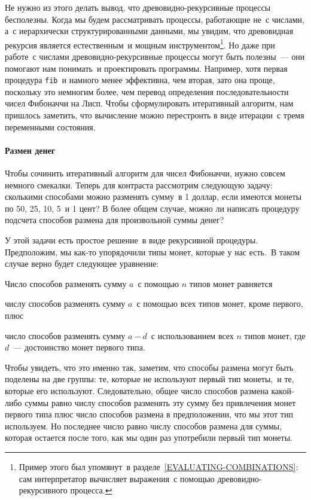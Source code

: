 Не нужно из этого делать вывод, что древовидно-рекурсивные
процессы бесполезны.  Когда мы будем рассматривать процессы,
работающие не~с числами, а~с иерархически структурированными данными,
мы увидим, что древовидная рекурсия является естественным~и мощным
инструментом\footnote{Пример этого был упомянут~в разделе~\ref{EVALUATING-COMBINATIONS}: сам интерпретатор
вычисляет выражения~с помощью дре\-во\-видно-рекурсивного процесса.
}.
Но даже при работе~с числами древовидно-рекурсивные процессы могут быть 
полезны~--- они помогают нам понимать~и проектировать программы.  Например, 
хотя первая процедура {\tt fib}~и намного менее эффективна, чем
вторая, зато она проще, поскольку это немногим более, чем перевод
определения последовательности чисел Фибоначчи на Лисп.  Чтобы
сформулировать итеративный алгоритм, нам пришлось заметить, что
вычисление можно перестроить в виде итерации~с тремя 
переменными \mbox{состояния}.

\paragraph{Размен денег}


Чтобы сочинить итеративный алгоритм для чисел Фибоначчи,
нужно совсем немного смекалки.  Теперь для контраста рассмотрим
следующую задачу: сколькими способами можно разменять сумму~в 1
доллар, если имеются монеты по 50, 25, 10, 5~и 1 цент? В более
общем случае, можно ли написать процедуру подсчета способов размена 
для произвольной суммы денег?

У этой задачи есть простое решение~в виде рекурсивной
процедуры.  Предположим, мы как-то упорядочили типы монет, которые у
нас есть.~В таком случае верно будет следующее уравнение:

Число способов разменять сумму $a$~с помощью $n$ типов монет равняется
\begin{plainlist}
\item числу способов разменять сумму
$a$~с помощью всех типов монет, кроме первого, плюс

\item число способов разменять сумму $a -
d$~с использованием всех $n$ типов монет, где
$d$~--- достоинство монет первого типа.
\end{plainlist}

Чтобы увидеть, что это именно так, заметим, что способы
размена могут быть поделены на две группы: те, которые не используют
первый тип монеты,~и те, которые его используют.  Следовательно, общее 
число способов размена какой-либо суммы равно числу способов разменять 
эту сумму без привлечения монет первого типа плюс число способов размена 
в предположении, что мы этот тип используем.  Но последнее число равно 
числу способов размена для суммы, которая остается после того, как мы
один раз употребили первый тип монеты.


